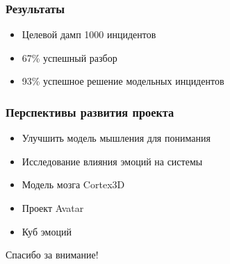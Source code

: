 \documentclass[14pt]{beamer}
\begin{document}
\begin{frame}
\frametitle{Результаты}
\begin{itemize}
	\item Целевой дамп 1000 инцидентов
	\item 67\% успешный разбор
	\item 93\% успешное решение модельных инцидентов
\end{itemize}
\end{frame}

\begin{frame}
\frametitle{Перспективы развития проекта}
\begin{itemize}
  \item Улучшить модель мышления для понимания
  \item Исследование влияния эмоций на системы
  \item Модель мозга Cortex3D
  \item Проект Avatar
  \item Куб эмоций
\end{itemize}
\end{frame}


\begin{frame}
\begin{center}
Спасибо за внимание!
\end{center}
\end{frame}
\end{document}
